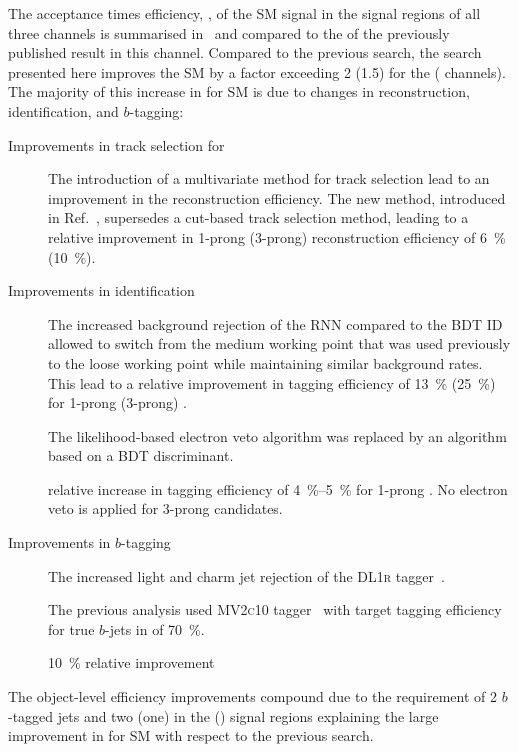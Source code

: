 The acceptance times efficiency, \AccTimesEff, of the SM \HH signal in
the signal regions of all three channels is summarised
in~ and compared to the \AccTimesEff of
the previously published result in this channel. Compared to the
previous search, the search presented here improves the SM \HH
\AccTimesEff by a factor exceeding 2 (1.5) for the \hadhad (\lephad
channels). The majority of this increase in \AccTimesEff for SM \HH is
due to changes in \tauhadvis reconstruction, identification, and
$b$-tagging:
\begin{description}

\item[Improvements in track selection for \tauhadvis] The introduction
  of a multivariate method for \tauhadvis track selection lead to an
  improvement in the \tauhadvis reconstruction efficiency. The new
  method, introduced in Ref.~\cite{duschinger}, supersedes a cut-based
  track selection method, leading to a relative improvement in 1-prong
  (3-prong) \tauhadvis reconstruction efficiency of \SI{6}{\percent}
  (\SI{10}{\percent}).

\item[Improvements in \tauhadvis identification]
  The increased background rejection of the RNN \tauid compared to the
  BDT ID allowed to switch from the medium working point that was used
  previously to the loose working point while maintaining similar
  background rates. This lead to a relative improvement in \tauhadvis
  tagging efficiency of \SI{13}{\percent} (\SI{25}{\percent}) for
  1-prong (3-prong) \tauhadvis.

  The likelihood-based electron veto algorithm was replaced by an
  algorithm based on a BDT discriminant.


  relative increase in tagging
  efficiency of \SIrange{4}{5}{\percent} for 1-prong \tauhadvis. No
  electron veto is applied for 3-prong \tauhadvis candidates.

\item[Improvements in $b$-tagging]

  The increased light and charm jet rejection of the \textsc{DL1r}
  tagger~\cite{ATL-PHYS-PUB-2017-013}.

  The previous analysis used \textsc{MV2c10}
  tagger~\cite{ATL-PHYS-PUB-2016-012} with target tagging efficiency
  for true $b$-jets in \ttbar of \SI{70}{\percent}.

  \SI{10}{\percent} relative improvement
\end{description}
The object-level efficiency improvements compound due to the
requirement of 2 $b$-tagged jets and two (one) \tauhadvis in the
\hadhad (\lephad) signal regions explaining the large improvement in
\AccTimesEff for SM \HH with respect to the previous
search.

